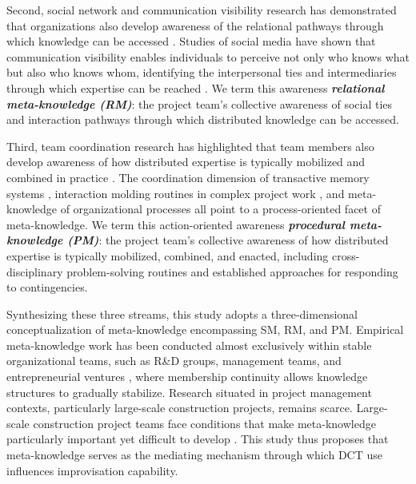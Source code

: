 \documentclass[authoryear,preprint,review,times,10pt]{elsarticle}
\begin{document}
Second, social network and communication visibility research has demonstrated that organizations also develop awareness of the relational pathways through which knowledge can be accessed \citep{borgatti2003Relational, leonardi2014Social}. Studies of social media have shown that communication visibility enables individuals to perceive not only who knows what but also who knows whom, identifying the interpersonal ties and intermediaries through which expertise can be reached \citep{fu2025Enterprise, engelbrecht2019How}. We term this awareness \textbf{\textit{relational meta-knowledge (RM)}}: the project team's collective awareness of social ties and interaction pathways through which distributed knowledge can be accessed. 

Third, team coordination research has highlighted that team members also develop awareness of how distributed expertise is typically mobilized and combined in practice \citep{faraj2000Coordinating}. The coordination dimension of transactive memory systems \citep{lewis2003Measuring, kush2019Conceptual}, interaction molding routines in complex project work \citep{korotkova2024Do}, and meta-knowledge of organizational processes \citep{barmeyer2019Informal} all point to a process-oriented facet of meta-knowledge. We term this action-oriented awareness \textbf{\textit{procedural meta-knowledge (PM)}}: the project team's collective awareness of how distributed expertise is typically mobilized, combined, and enacted, including cross-disciplinary problem-solving routines and established approaches for responding to contingencies.

Synthesizing these three streams, this study adopts a three-dimensional conceptualization of meta-knowledge encompassing SM, RM, and PM. Empirical meta-knowledge work has been conducted almost exclusively within stable organizational teams, such as R\&D groups, management teams, and entrepreneurial ventures \citep{mohammadparsttabas2024Igniting, ren2011Transactive, kush2019Conceptual}, where membership continuity allows knowledge structures to gradually stabilize. Research situated in project management contexts, particularly large-scale construction projects, remains scarce. Large-scale construction project teams face conditions that make meta-knowledge particularly important yet difficult to develop \citep{korotkova2024Do}. This study thus proposes that meta-knowledge serves as the mediating mechanism through which DCT use influences improvisation capability.
\end{document}
